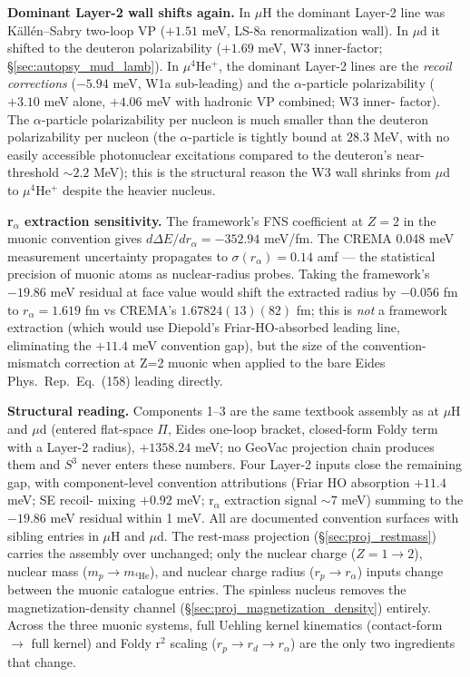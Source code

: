 \documentclass[11pt]{article}
\begin{document}
\textbf{Dominant Layer-2 wall shifts again.}  In $\mu$H the dominant
Layer-2 line was K\"all\'en--Sabry two-loop VP ($+1.51$ meV, LS-8a
renormalization wall).  In $\mu$d it shifted to the deuteron polarizability
($+1.69$ meV, W3 inner-factor; \S\ref{sec:autopsy_mud_lamb}).  In
$\mu^4$He$^+$, the dominant Layer-2 lines are the \emph{recoil corrections}
($-5.94$ meV, W1a sub-leading) and the $\alpha$-particle polarizability
($+3.10$ meV alone, $+4.06$ meV with hadronic VP combined; W3 inner-
factor).  The $\alpha$-particle polarizability per nucleon is much smaller
than the deuteron polarizability per nucleon (the $\alpha$-particle is
tightly bound at $28.3$ MeV, with no easily accessible photonuclear
excitations compared to the deuteron's near-threshold $\sim 2.2$ MeV);
this is the structural reason the W3 wall shrinks from $\mu$d to
$\mu^4$He$^+$ despite the heavier nucleus.

\textbf{r$_\alpha$ extraction sensitivity.}  The framework's FNS
coefficient at $Z=2$ in the muonic convention gives $d \Delta E /
d r_\alpha = -352.94$ meV/fm.  The CREMA 0.048 meV measurement
uncertainty propagates to $\sigma(r_\alpha) = 0.14$ amf --- the
statistical precision of muonic atoms as nuclear-radius probes.  Taking
the framework's $-19.86$ meV residual at face value would shift the
extracted radius by $-0.056$ fm to $r_\alpha = 1.619$ fm vs CREMA's
$1.67824(13)(82)$ fm; this is \emph{not} a framework extraction (which
would use Diepold's Friar-HO-absorbed leading line, eliminating the
$+11.4$ meV convention gap), but the size of the convention-mismatch
correction at Z=2 muonic when applied to the bare Eides Phys.\ Rep.\ Eq.~(158)
leading directly.

\textbf{Structural reading.}  Components 1--3 are the same textbook
assembly as at $\mu$H and $\mu$d (entered flat-space $\Pi$, Eides
one-loop bracket, closed-form Foldy term with a Layer-2 radius),
$+1358.24$ meV; no GeoVac projection chain produces them and $S^3$
never enters these numbers.  Four Layer-2 inputs close the remaining
gap, with component-level
convention attributions (Friar HO absorption $+11.4$ meV; SE recoil-
mixing $+0.92$ meV; r$_\alpha$ extraction signal $\sim 7$ meV) summing
to the $-19.86$ meV residual within 1 meV.  All are documented
convention surfaces with sibling
entries in $\mu$H and $\mu$d.  The rest-mass projection
(\S\ref{sec:proj_restmass}) carries the assembly over unchanged; only
the nuclear charge ($Z = 1 \to 2$), nuclear
mass ($m_p \to m_{^4\text{He}}$), and nuclear charge radius ($r_p \to
r_\alpha$) inputs change between the muonic catalogue entries.  The
spinless nucleus removes the magnetization-density channel
(\S\ref{sec:proj_magnetization_density}) entirely.  Across the three
muonic systems, full Uehling kernel kinematics (contact-form
$\to$ full kernel) and Foldy r$^2$ scaling ($r_p \to r_d \to r_\alpha$)
are the only two ingredients that change.
\end{document}
